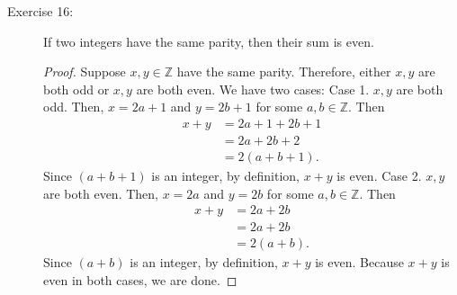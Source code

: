 \documentclass[12pt]{article}
\begin{document}
\begin{description}
\item[Exercise 16:] If two integers have the same parity, then their sum is even.

\begin{spacing}{2}
\begin{proof}
Suppose $x,y \in \mathbb{Z}$ have the same parity. Therefore, either $x,y$ are both odd or $x,y$ are both even. We have two cases:
\newline
Case 1. $x,y$ are both odd. Then, $x=2a+1$ and $y=2b+1$ for some $a,b \in \mathbb{Z}$. Then
\begin{align*}
x+y &= 2a+1 + 2b+1 \\
&= 2a + 2b + 2 \\
&= 2(a + b + 1).
\end{align*}
Since $(a+b+1)$ is an integer, by definition, $x+y$ is even.
\newline
Case 2. $x,y$ are both even. Then, $x=2a$ and $y=2b$ for some $a,b \in \mathbb{Z}$. Then
\begin{align*}
x+y &= 2a + 2b \\
&= 2a + 2b \\
&= 2(a + b).
\end{align*}
Since $(a+b)$ is an integer, by definition, $x+y$ is even.
\newline
Because $x+y$ is even in both cases, we are done.
\end{proof}
\end{spacing} 
\end{description}
%
\newpage
{}
%
\end{document}
